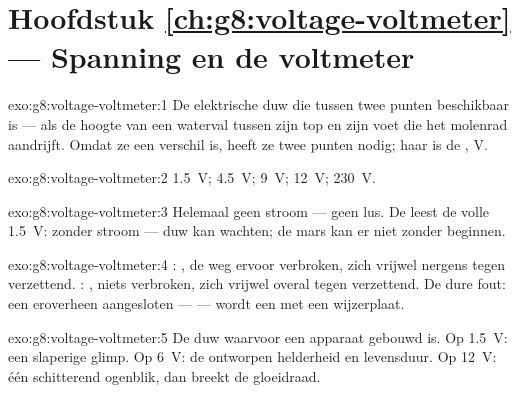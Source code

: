 \section*{Hoofdstuk \ref{ch:g8:voltage-voltmeter} --- Spanning en de voltmeter}

\begin{solution}{exo:g8:voltage-voltmeter:1}
De elektrische duw die tussen twee punten beschikbaar is --- als de
hoogte van een waterval tussen zijn top en zijn voet die het molenrad
aandrijft. Omdat ze een verschil is, heeft ze twee punten nodig; haar
 is de , \unit{V}.
\end{solution}

\begin{solution}{exo:g8:voltage-voltmeter:2}
\qty{1.5}{V}; \qty{4.5}{V}; \qty{9}{V}; \qty{12}{V}; \qty{230}{V}.
\end{solution}

\begin{solution}{exo:g8:voltage-voltmeter:3}
Helemaal geen stroom --- geen lus. De  leest de volle
\qty{1.5}{V}:  zonder stroom --- duw kan wachten; de mars
kan er niet zonder beginnen.
\end{solution}

\begin{solution}{exo:g8:voltage-voltmeter:4}
: , de weg ervoor verbroken, zich
vrijwel nergens tegen verzettend. :
, niets verbroken, zich vrijwel overal tegen
verzettend. De dure fout: een  eroverheen
aangesloten ---  --- wordt een
 met een wijzerplaat.
\end{solution}

\begin{solution}{exo:g8:voltage-voltmeter:5}
De duw waarvoor een apparaat gebouwd is. Op \qty{1.5}{V}: een slaperige
glimp. Op \qty{6}{V}: de ontworpen helderheid en levensduur. Op
\qty{12}{V}: één schitterend ogenblik, dan breekt de gloeidraad.
\end{solution}

